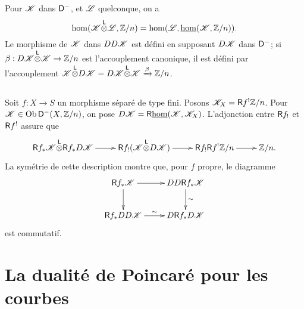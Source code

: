 Pour $\mathscr{K}$ dans $\mathsf{D}^-$, et $\mathscr{L}$ quelconque, on a 
\[
  \hom(\mathscr{K}{\overset{\mathsf{L}}{\otimes}} \mathscr{L},\mathbb{Z}/n) = \hom(\mathscr{L},\underline\hom(\mathscr{K},\mathbb{Z}/n)) \text{.}
\]
Le morphisme de $\mathscr{K}$ dans $DD\mathscr{K}$ est d\'efini en supposant $D\mathscr{K}$ dans 
$\mathsf{D}^-$; si $\beta:D\mathscr{K}{\overset{\mathsf{L}}{\otimes}}\mathscr{K}\to \mathbb{Z}/n$ est l'accouplement canonique, il 
est d\'efini par l'accouplement 
$\mathscr{K}{\overset{\mathsf{L}}{\otimes}} D\mathscr{K}=D\mathscr{K}{\overset{\mathsf{L}}{\otimes}} \mathscr{K} \xrightarrow\beta \mathbb{Z}/n$. 





\subsection{}\label{V:1-2}

Soit $f:X\to S$ un morphisme s\'epar\'e de type fini. Posons 
$\mathscr{K}_X=\mathsf{R} f^!\mathbb{Z}/n$. Pour $\mathscr{K}\in \operatorname{Ob}\mathsf{D}^-(X,\mathbb{Z}/n)$, on pose 
$D\mathscr{K} = \mathsf{R}\underline\hom(\mathscr{K},\mathscr{K}_X)$. L'adjonction entre $\mathsf{R} f_!$ et $\mathsf{R} f^!$ 
assure que 
\[\xymatrix{
  \R f_\ast \cK\lotimes \R f_\ast D\cK \ar[r] 
    & \R f_! (\cK\lotimes D\cK) \ar[r] 
    & \R f_! \R f^! \dZ/n \ar[r] 
    & \dZ/n \text{.}
}\]
La sym\'etrie de cette description montre que, pour $f$ propre, le diagramme 
\begin{equation}\label{V:eq:1-2-1}
\xymatrix{
  \R f_\ast \cK \ar[r] \ar[d] 
    & D D \R f_\ast \cK \ar[d]^-\sim \\
  \R f_\ast D D \cK \ar[r]^\sim 
    & D\R f_\ast D\cK
}
\end{equation}
est commutatif. 


\section{La dualité de Poincaré pour les courbes}\label{V:2}
